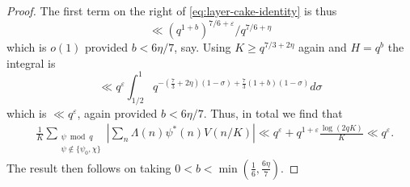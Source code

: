 \documentclass[10pt,a4paper]{amsart}
\newcommand{\eps}{\varepsilon}
\newcommand{\geqs}{\geqslant }
\begin{document}
\begin{proof}
The first term on the right of \eqref{eq:layer-cake-identity} is thus 
\[
\ll (q^{1+b})^{7/6+\eps}/q^{7/6+\eta}
\]
which is $o(1)$ provided $b<6\eta/7$, say. Using $K\geqs q^{7/3+2\eta}$ again and $H=q^b$ the integral is 
\[
\ll q^{\eps}\int_{1/2}^1 q^{-(\tfrac73+2\eta)(1-\sigma)+\tfrac73(1+b)(1-\sigma)}d\sigma
\]
which is $\ll q^\eps$, again provided $b<6\eta/7$. Thus, in total we find that 
\begin{align}
 &\frac1K
 \sum_{\substack{\psi\bmod q\\\psi\notin\{\psi_0,\chi\}}}
 \left|\sum_n\Lambda(n)\psi^*(n)V(n/K)\right|
\ll
 q^{\eps}
 +q^{1+\eps }\frac{\log(2qK)}K\ll q^\eps.
 \label{eq:primitive-prime-aggregate}
\end{align}
The result then follows on taking $0<b<\min(\tfrac16,\tfrac{6\eta}{7})$.
\end{proof}
\end{document}
